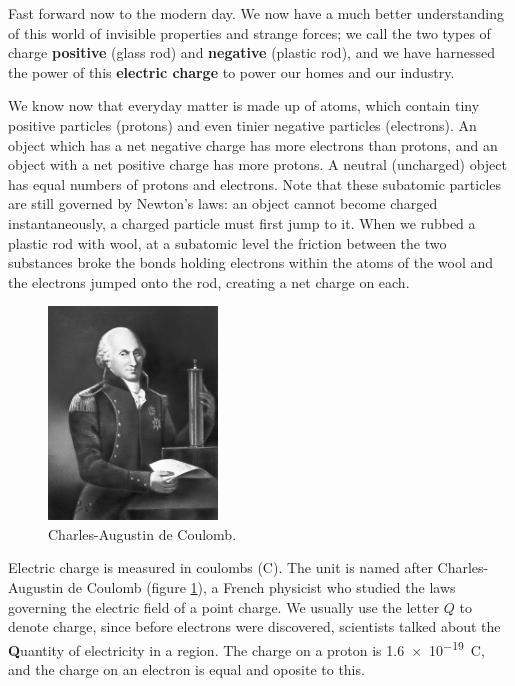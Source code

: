 \documentclass[a4paper]{amsbook}
\newcommand\capcite[1]{}
\begin{document}
Fast forward now to the modern day. We now have a much better understanding of this world of invisible properties
and strange forces; we call the two types of charge \textbf{positive} (glass rod) and \textbf{negative} (plastic rod),
and we have harnessed the power of this \textbf{electric charge} to power our homes and our industry.

We know now that everyday matter is made up of atoms, which contain tiny positive particles (protons) and even tinier
negative particles (electrons). An object which has a net negative charge has more electrons than protons, and an
object with a net positive charge has more protons. A neutral (uncharged) object has equal numbers of protons and
electrons. Note that these subatomic particles are still governed by Newton's laws: an object cannot become charged
instantaneously, a charged particle must first jump to it. When we rubbed a plastic rod with wool, at a subatomic
level the friction between the two substances broke the bonds holding electrons within the atoms of the wool and
the electrons jumped onto the rod, creating a net charge on each.

\begin{figure}
  \centering
  \includegraphics[width=0.4\textwidth]{coulomb}
  \caption{Charles-Augustin de Coulomb. \capcite{https://i.pinimg.com/736x/c1/d3/ab/c1d3abe6a6b800a8bfad883ccff23b5e--coulomb-scientists.jpg}\label{fig:coulomb}}
\end{figure}
Electric charge is measured in coulombs (C). The unit is named after Charles-Augustin de Coulomb (figure \ref{fig:coulomb}), a French physicist
who studied the laws governing the electric field of a point charge. We usually use the letter $ Q $ to denote charge, since before electrons
were discovered, scientists talked about the \textbf{Q}uantity of electricity in a region. The charge on a proton is \SI{1.6e-19}{\coulomb},
and the charge on an electron is equal and oposite to this.
\end{document}
